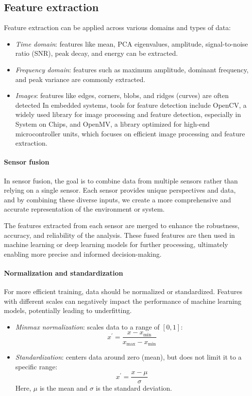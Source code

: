 \subsection{Feature extraction} 
Feature extraction can be applied across various domains and types of data:
\begin{itemize}
    \item \textit{Time domain}: features like mean, PCA eigenvalues, amplitude, signal-to-noise ratio (SNR), peak decay, and energy can be extracted.
    \item \textit{Frequency domain}: features such as maximum amplitude, dominant frequency, and peak variance are commonly extracted.
    \item \textit{Images}: features like edges, corners, blobs, and ridges (curves) are often detected
    In embedded systems, tools for feature detection include OpenCV, a widely used library for image processing and feature detection, especially in System on Chips, and OpenMV, a library optimized for high-end microcontroller units, which focuses on efficient image processing and feature extraction.
\end{itemize}

\paragraph*{Sensor fusion}
In sensor fusion, the goal is to combine data from multiple sensors rather than relying on a single sensor. 
Each sensor provides unique perspectives and data, and by combining these diverse inputs, we create a more comprehensive and accurate representation of the environment or system.

The features extracted from each sensor are merged to enhance the robustness, accuracy, and reliability of the analysis. 
These fused features are then used in machine learning or deep learning models for further processing, ultimately enabling more precise and informed decision-making.

\paragraph*{Normalization and standardization}
For more efficient training, data should be normalized or standardized. 
Features with different scales can negatively impact the performance of machine learning models, potentially leading to underfitting.
\begin{itemize}
    \item \textit{Minmax normalization}: scales data to a range of $[0,1]$:
        \[x^\prime=\dfrac{x-x_{\min}}{x_{\max}-x_{\min}}\]
    \item \textit{Standardization}: centers data around zero (mean), but does not limit it to a specific range:
        \[x^\prime=\dfrac{x-\mu}{\sigma}\]
        Here, $\mu$ is the mean and $\sigma$ is the standard deviation. 
\end{itemize}